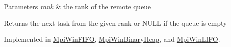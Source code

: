 \begin{DoxyParams}{Parameters}
{\em rank} & the rank of the remote queue\\
\hline
\end{DoxyParams}
\begin{DoxyReturn}{Returns}
the next task from the given rank or N\+U\+L\+L if the queue is empty 
\end{DoxyReturn}


Implemented in \hyperlink{a00029_a8f4af1f3c3f90b939f3638bf321be3bf}{Mpi\+Win\+F\+I\+F\+O}, \hyperlink{a00028_a713a9f45479e2b80a880867bbb003b8d}{Mpi\+Win\+Binary\+Heap}, and \hyperlink{a00030_a0631b1fc2042f19a5b438c8cfa44934a}{Mpi\+Win\+L\+I\+F\+O}.

